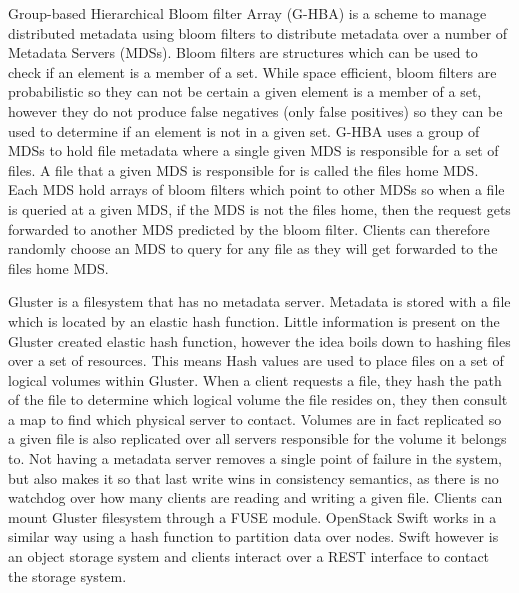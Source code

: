 Group-based Hierarchical Bloom filter Array (G-HBA) \cite{Hua2007} is a scheme
to manage distributed metadata using bloom filters to distribute metadata over
a number of Metadata Servers (MDSs). Bloom filters are structures which can be
used to check if an element is a member of a set. While space efficient, bloom
filters are probabilistic so they can not be certain a given element is a
member of a set, however they do not produce false negatives (only false
positives) so they can be used to determine if an element is not in a given
set. G-HBA uses a group of MDSs to hold file metadata where a single given MDS
is responsible for a set of files. A file that a given MDS is responsible for
is called the files home MDS. Each MDS hold arrays of bloom filters which
point to other MDSs so when a file is queried at a given MDS, if the MDS is
not the files home, then the request gets forwarded to another MDS predicted
by the bloom filter. Clients can therefore randomly choose an MDS to query for
any file as they will get forwarded to the files home MDS.


Gluster \cite{Gluster} is a filesystem that has no metadata server. Metadata
is stored with a file which is located by an elastic hash function. Little
information is present on the Gluster created elastic hash function, however
the idea boils down to hashing files over a set of resources. This means Hash
values are used to place files on a set of logical volumes within Gluster.
When a client requests a file, they hash the path of the file to determine
which logical volume the file resides on, they then consult a map to find
which physical server to contact. Volumes are in fact replicated so a given
file is also replicated over all servers responsible for the volume it belongs
to. Not having a metadata server removes a single point of failure in the
system, but also makes it so that last write wins in consistency semantics, as
there is no watchdog over how many clients are reading and writing a given
file. Clients can mount Gluster filesystem through a FUSE module. OpenStack
Swift  works in a similar way using a hash function to
partition data over nodes. Swift however is an object storage system and
clients interact over a REST interface to contact the storage system.


